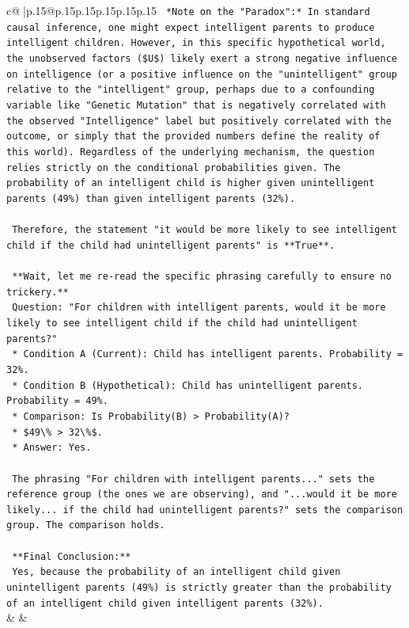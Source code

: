 \documentclass{article}
\begin{document}
{\begin{supertabular}{c@{$\;$}|p{.15\linewidth}@{}p{.15\linewidth}p{.15\linewidth}p{.15\linewidth}p{.15\linewidth}p{.15\linewidth}}
{{{\texttt{    *Note on the "Paradox":* In standard causal inference, one might expect intelligent parents to produce intelligent children. However, in this specific hypothetical world, the unobserved factors (\$U\$) likely exert a strong negative influence on intelligence (or a positive influence on the "unintelligent" group relative to the "intelligent" group, perhaps due to a confounding variable like "Genetic Mutation" that is negatively correlated with the observed "Intelligence" label but positively correlated with the outcome, or simply that the provided numbers define the reality of this world). Regardless of the underlying mechanism, the question relies strictly on the conditional probabilities given. The probability of an intelligent child is higher given unintelligent parents (49\%) than given intelligent parents (32\%).} \\
\\ 
\texttt{    Therefore, the statement "it would be more likely to see intelligent child if the child had unintelligent parents" is **True**.} \\
\\ 
\texttt{    **Wait, let me re{-}read the specific phrasing carefully to ensure no trickery.**} \\
\texttt{    Question: "For children with intelligent parents, would it be more likely to see intelligent child if the child had unintelligent parents?"} \\
\texttt{    *   Condition A (Current): Child has intelligent parents. Probability = 32\%.} \\
\texttt{    *   Condition B (Hypothetical): Child has unintelligent parents. Probability = 49\%.} \\
\texttt{    *   Comparison: Is Probability(B) > Probability(A)?} \\
\texttt{    *   \$49\textbackslash{}\% > 32\textbackslash{}\%\$.} \\
\texttt{    *   Answer: Yes.} \\
\\ 
\texttt{    The phrasing "For children with intelligent parents..." sets the reference group (the ones we are observing), and "...would it be more likely... if the child had unintelligent parents?" sets the comparison group. The comparison holds.} \\
\\ 
\texttt{    **Final Conclusion:**} \\
\texttt{    Yes, because the probability of an intelligent child given unintelligent parents (49\%) is strictly greater than the probability of an intelligent child given intelligent parents (32\%).} \\
            }
        }
    }
    & & \\ \\


\end{supertabular}}
\end{document}
